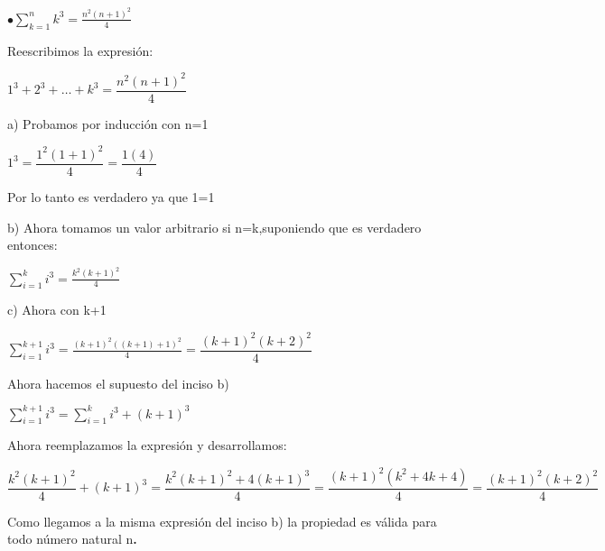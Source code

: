 \documentclass[12pt,a4paper,scrartcl]{article}
\begin{document}
\newpage
\begin{flushleft}
$\displaystyle\bullet
\sum_{k=1}^{n}k^{3} = \frac{n^2(n+1)^2}{4}$\\
\end{flushleft}
\begin{flushleft}
Reescribimos la expresi\'on:\\
\end{flushleft}
\begin{center}
$1^3+2^3+\ldots+k^3=\dfrac{n^{2}(n+1)^2}{4}$\\
\end{center}
\begin{flushleft}
a) Probamos por inducci\'on con n=1\\
\end{flushleft}
\begin{center}
$1^3=\dfrac{1^{2}(1+1)^2}{4} = \dfrac{1(4)}{4}$\\
\end{center}
\begin{flushleft}
Por lo tanto es verdadero ya que 1=1\\\vspace{1em}
\end{flushleft}
\begin{flushleft}
b) Ahora tomamos un valor arbitrario si n=k,suponiendo que es verdadero entonces:\\
\end{flushleft}
\begin{center}
$\displaystyle
\sum_{i=1}^{k}i^{3} = \frac{k^2(k+1)^2}{4}$\\
\end{center}

c) Ahora con k+1
\begin{center}
$\displaystyle
\sum_{i=1}^{k+1}i^{3} = \frac{(k+1)^2((k+1)+1)^2}{4} = \dfrac{(k+1)^2(k+2)^2}{4}$\\
\end{center}
\begin{flushleft}
Ahora hacemos el supuesto del inciso b)\\
\end{flushleft}

$\displaystyle
\sum_{i=1}^{k+1}i^{3} = \sum_{i=1}^{k}i^{3} + (k+1)^3$\\
\begin{flushleft}
Ahora reemplazamos la expresi\'on y desarrollamos:
\end{flushleft}
$\dfrac{k^2(k+1)^2}{4}+(k+1)^3 = \dfrac{k^2(k+1)^2+4(k+1)^3}{4}
=\dfrac{(k+1)^2(k^2+4k+4)}{4}=\dfrac{(k+1)^2(k+2)^2}{4}$\\\vspace{1em}
\begin{flushleft}
Como llegamos a la misma expresi\'on del inciso b) la propiedad es v\'alida para todo n\'umero natural n\textbf{.}
\end{flushleft}
\end{document}
